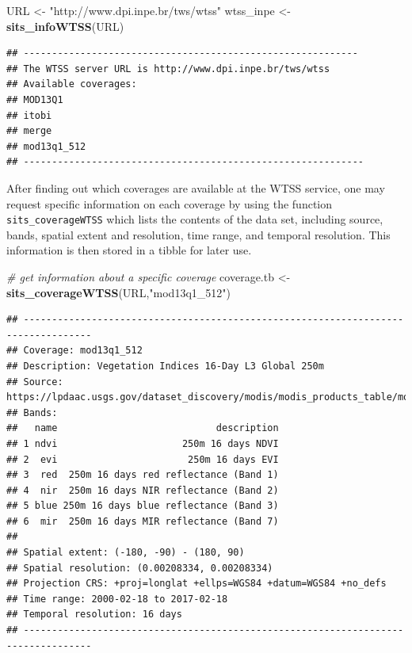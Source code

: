 \documentclass[11pt,]{article}
\newenvironment{Shaded}{\begin{snugshade}}{\end{snugshade}}
\newcommand{\KeywordTok}[1]{\textcolor[rgb]{0.13,0.29,0.53}{\textbf{#1}}}
\newcommand{\StringTok}[1]{\textcolor[rgb]{0.31,0.60,0.02}{#1}}
\newcommand{\CommentTok}[1]{\textcolor[rgb]{0.56,0.35,0.01}{\textit{#1}}}
\newcommand{\NormalTok}[1]{#1}
\begin{document}
\begin{Shaded}
\begin{Highlighting}[]
\NormalTok{URL <-}\StringTok{ "http://www.dpi.inpe.br/tws/wtss"}
\NormalTok{wtss_inpe <-}\StringTok{ }\KeywordTok{sits_infoWTSS}\NormalTok{(URL)}
\end{Highlighting}
\end{Shaded}

\begin{verbatim}
## -----------------------------------------------------------
## The WTSS server URL is http://www.dpi.inpe.br/tws/wtss
## Available coverages: 
## MOD13Q1
## itobi
## merge
## mod13q1_512
## ------------------------------------------------------------
\end{verbatim}

After finding out which coverages are available at the WTSS service, one
may request specific information on each coverage by using the function
\texttt{sits\_coverageWTSS} which lists the contents of the data set,
including source, bands, spatial extent and resolution, time range, and
temporal resolution. This information is then stored in a tibble for
later use.

\begin{Shaded}
\begin{Highlighting}[]
\CommentTok{# get information about a specific coverage}
\NormalTok{coverage.tb <-}\StringTok{ }\KeywordTok{sits_coverageWTSS}\NormalTok{(URL,}\StringTok{"mod13q1_512"}\NormalTok{)}
\end{Highlighting}
\end{Shaded}

\begin{verbatim}
## ----------------------------------------------------------------------------------
## Coverage: mod13q1_512
## Description: Vegetation Indices 16-Day L3 Global 250m
## Source: https://lpdaac.usgs.gov/dataset_discovery/modis/modis_products_table/mod13q1
## Bands: 
##   name                            description
## 1 ndvi                      250m 16 days NDVI
## 2  evi                       250m 16 days EVI
## 3  red  250m 16 days red reflectance (Band 1)
## 4  nir  250m 16 days NIR reflectance (Band 2)
## 5 blue 250m 16 days blue reflectance (Band 3)
## 6  mir  250m 16 days MIR reflectance (Band 7)
## 
## Spatial extent: (-180, -90) - (180, 90)
## Spatial resolution: (0.00208334, 0.00208334)
## Projection CRS: +proj=longlat +ellps=WGS84 +datum=WGS84 +no_defs
## Time range: 2000-02-18 to 2017-02-18
## Temporal resolution: 16 days 
## ----------------------------------------------------------------------------------
\end{verbatim}
\end{document}
